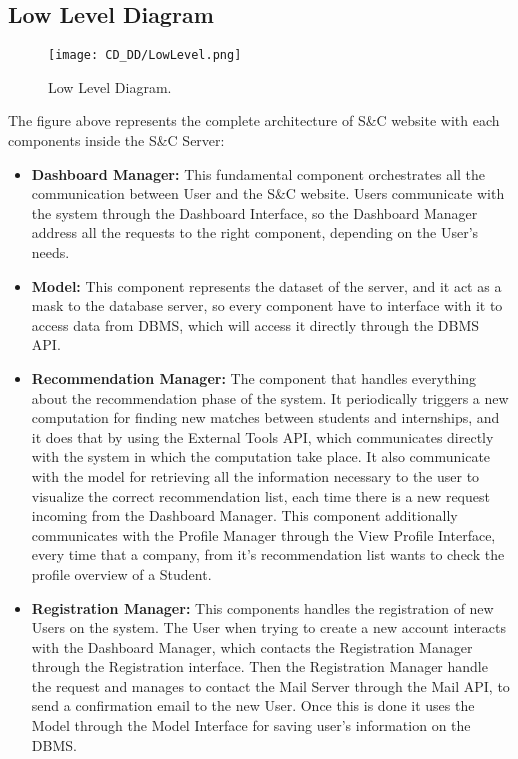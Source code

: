 \subsection{Low Level Diagram}
\label{subsec:low_level_diagram}%

\begin{figure}[H]
    \begin{center}
        \texttt{[image: CD\_DD/LowLevel.png]}
        \caption{Low Level Diagram.}
        \label{fig:low_level_diagram}%
    \end{center}
\end{figure}

\noindent The figure above represents the complete architecture of S\&C website with each components inside the S\&C Server:
\begin{itemize}
    \item \textbf{Dashboard Manager:} This fundamental component orchestrates all the communication between User and the S\&C website. Users communicate with the system through the Dashboard Interface, so the Dashboard Manager address all the requests to the right component, depending on the User's needs. 
    \item \textbf{Model:} This component represents the dataset of the server, and it act as a mask to the database server, so every component have to interface with it to access data from DBMS, which will access it directly through the DBMS API. 
    \item \textbf{Recommendation Manager:}  The component that handles everything about the recommendation phase of the system. It periodically triggers a new computation for finding new matches between students and internships, and it does that by using the External Tools API, which communicates directly with the system in which the computation take place. It also communicate with the model for retrieving all the information necessary to the user to visualize the correct recommendation list, each time there is a new request incoming from the Dashboard Manager. This component additionally communicates with the Profile Manager through the View Profile Interface, every time that a company, from it's recommendation list wants to check the profile overview of a Student.
    \item \textbf{Registration Manager:} This components handles the registration of new Users on the system. The User when trying to create a new account interacts with the Dashboard Manager, which contacts the Registration Manager through the Registration interface. Then the Registration Manager handle the request and manages to contact the Mail Server through the Mail API, to send a confirmation email to the new User. Once this is done it uses the Model through the Model Interface for saving user's information on the DBMS.

\end{itemize}
